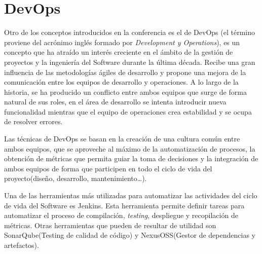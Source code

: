 \section{DevOps}

Otro de los conceptos introducidos en la conferencia es el de DevOps (el término proviene del acrónimo inglés formado por \textit{Development y Operations}), es un concepto que ha atraído un interés creciente en el ámbito de la gestión de proyectos y la ingeniería del Software durante la última década. Recibe una gran influencia de las metodologías ágiles de desarrollo y propone una mejora de la comunicación entre los equipos de desarrollo y operaciones. A lo largo de la historia, se ha producido un conflicto entre ambos equipos que surge de forma natural de sus roles, en el área de desarrollo se intenta introducir nueva funcionalidad mientras que el equipo de operaciones crea estabilidad y se ocupa de resolver errores. 

Las técnicas de DevOps se basan en la creación de una cultura común entre ambos equipos, que se aproveche al máximo de la automatización de procesos, la obtención de métricas que permita guiar la toma de decisiones y la integración de ambos equipos de forma que participen en todo el ciclo de vida del proyecto(diseño, desarrollo, mantenimiento…).

Una de las herramientas más utilizadas para automatizar las actividades del ciclo de vida del Software es Jenkins. Esta herramienta permite definir tareas para automatizar el proceso de compilación, \textit{testing}, despliegue y recopilación de métricas. Otras herramientas que pueden de resultar de utilidad son SonarQube(Testing de calidad de código) y NexusOSS(Gestor de dependencias y artefactos).






